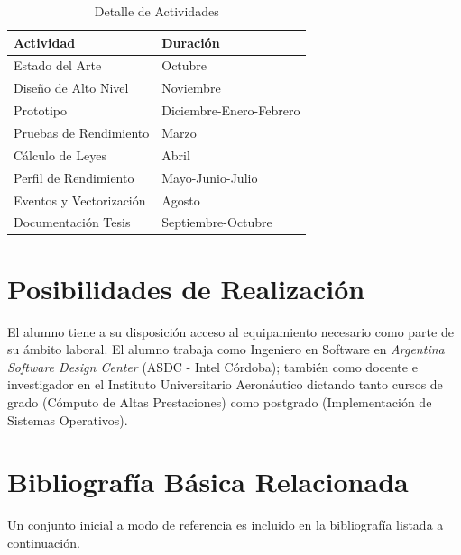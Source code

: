 \documentclass[a4paper]{article}
\begin{document}
\begin{table}[H]
  \caption{Detalle de Actividades}
  \centering
    \begin{tabular}{|l|l|}\hline
      {\bf Actividad} & {\bf Duración} \\ \hline
	Estado del Arte & Octubre \\ \hline
      Diseño de Alto Nivel & Noviembre \\ \hline
      Prototipo & Diciembre-Enero-Febrero \\ \hline
      Pruebas de Rendimiento & Marzo \\ \hline
      Cálculo de Leyes & Abril \\ \hline
      Perfil de Rendimiento & Mayo-Junio-Julio \\ \hline
      Eventos y Vectorización & Agosto \\ \hline
      Documentación Tesis & Septiembre-Octubre \\ \hline
    \end{tabular}
  \label{schedule}
\end{table}

\section{Posibilidades de Realización}

El alumno tiene a su disposición acceso al equipamiento necesario como parte de su ámbito laboral.
El alumno trabaja como Ingeniero en Software en {\it Argentina Software Design Center} (ASDC - Intel Córdoba); también
como docente e investigador en el Instituto Universitario Aeronáutico dictando tanto cursos de grado (Cómputo de Altas Prestaciones) como postgrado (Implementación de Sistemas Operativos).

\section{Bibliografía Básica Relacionada}

Un conjunto inicial a modo de referencia es incluido en la bibliografía listada a continuación.
\end{document}
